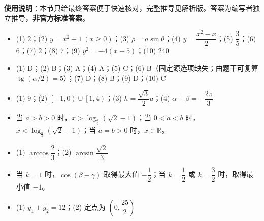 
\begin{gknotice}
\textbf{使用说明}：本节只给最终答案便于快速核对，完整推导见解析版。答案为编写者独立推导，\textbf{非官方标准答案}。
\end{gknotice}

\begin{itemize}[leftmargin=2.6em]
  \item[\textbf{1.}] (1) $2$；(2) $y=x^2+1\ (x\ge0)$；(3) $\rho=a\sin\theta$；(4) $y=\dfrac{x^2-x}{2}$；(5) $\dfrac35$；(6) $6$；(7) $2$；(8) $7$；(9) $y^2=-4(x-5)$；(10) $240$
  \item[\textbf{2.}] (1) D；(2) B；(3) A；(4) A；(5) C；(6) B（固定源选项缺失；由题干可复算 $\operatorname{tg}(\alpha/2)=5$）；(7) D；(8) B；(9) D；(10) C
  \item[\textbf{3.}] (1) $9$；(2) $\left[-1,0\right)\cup\left[1,4\right)$；(3) $h=\dfrac{\sqrt3}{2}a$；(4) $\alpha+\beta=-\dfrac{2\pi}{3}$
  \item[\textbf{4.}] 当 $a>b>0$ 时，$x>\log_{\frac ab}(\sqrt2-1)$；当 $0<a<b$ 时，$x<\log_{\frac ab}(\sqrt2-1)$；当 $a=b>0$ 时，$x\in\mathbb R$。
  \item[\textbf{5.}] (1) $\arccos\dfrac23$；(2) $\arcsin\dfrac{\sqrt2}{3}$
  \item[\textbf{6.}] 当 $k=1$ 时，$\cos(\beta-\gamma)$ 取得最大值 $-\dfrac12$；当 $k=\dfrac12$ 或 $k=\dfrac32$ 时，取得最小值 $-1$。
  \item[\textbf{7.}] (1) $y_1+y_2=12$；(2) 定点为 $\left(0,\dfrac{25}{2}\right)$
\end{itemize}
